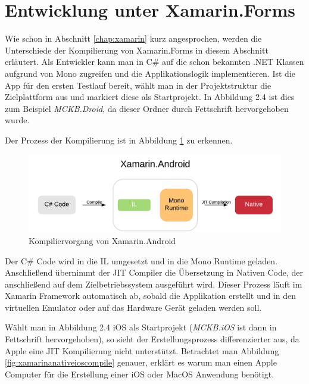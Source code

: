 	\newpage

\section{Entwicklung unter Xamarin.Forms}
\label{sec:xamarinformsdevelopement}

	Wie schon in Abschnitt \ref{chap:xamarin} kurz angesprochen, werden die Unterschiede der Kompilierung von Xamarin.Forms in diesem Abschnitt erläutert. Als Entwickler kann man in C\# auf die schon bekannten .NET Klassen  aufgrund von Mono zugreifen und die Applikationslogik implementieren. Ist die App für den ersten Testlauf bereit, wählt man in der Projektstruktur die Zielplattform aus und markiert diese als Startprojekt. In Abbildung 2.4 ist dies zum Beispiel \textit{MCKB.Droid}, da dieser Ordner durch Fettschrift hervorgehoben wurde.

	Der Prozess der Kompilierung ist in Abbildung \ref{fig:xamarinanativeandroidcompile} zu erkennen.

	\begin{figure}[h!]
		\centering
		\includegraphics[width=1\textwidth]{images/Xamarin-Android.png}
		\caption{Kompiliervorgang von Xamarin.Android}
		\label{fig:xamarinanativeandroidcompile}
	\end{figure}

	Der C\# Code wird in die IL umgesetzt und in die Mono Runtime geladen. Anschließend übernimmt der JIT Compiler die Übersetzung in Nativen Code, der anschließend auf dem Zielbetriebssystem ausgeführt wird. Dieser Prozess läuft im Xamarin Framework automatisch ab, sobald die Applikation erstellt und in den virtuellen Emulator oder auf das Hardware Gerät geladen werden soll.

	Wählt man in Abbildung 2.4 iOS als Startprojekt (\textit{MCKB.iOS} ist dann in Fettschrift hervorgehoben), so sieht der Erstellungsprozess differenzierter aus, da Apple eine JIT Kompilierung nicht unterstützt. Betrachtet man Abbildung \ref{fig:xamarinanativeioscompile} genauer, erklärt es warum man einen Apple Computer für die Erstellung einer iOS oder MacOS Anwendung benötigt.

